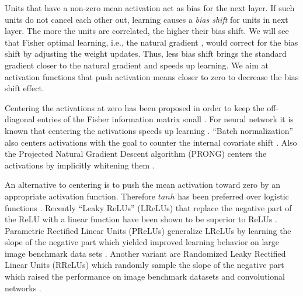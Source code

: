\documentclass{article}
\begin{document}
Units that have a non-zero mean activation act as bias for
the next layer.
If such units do not cancel each other out,
learning causes a {\em bias shift} for units in next layer.
The more the units are correlated, the higher their bias shift.
We will see that Fisher optimal learning, i.e., the natural
gradient \citep{Amari:98},
would correct for the bias shift
by adjusting the weight updates.
Thus, less bias shift brings the standard gradient closer to
the natural gradient and speeds up learning.
We aim at activation functions that push activation means closer to zero
to decrease the bias shift effect.

Centering the activations at zero
has been proposed in order to keep the off-diagonal entries of the
Fisher information matrix small \citep{Raiko:12}.
For neural network it is known that centering the activations
speeds up learning \citep{LeCun:91,LeCun:98,Schraudolph:98}.
%
``Batch normalization'' also centers activations with the goal
to counter the internal covariate shift \citep{Ioffe:15}.
Also the Projected Natural Gradient Descent algorithm (PRONG)
centers the activations by implicitly whitening them
\citep{Desjardins:15}.

An alternative to centering is to push the mean activation toward zero by
an appropriate activation function.
Therefore $tanh$ has been preferred over
logistic functions \citep{LeCun:91,LeCun:98}.
Recently ``Leaky ReLUs'' (LReLUs)
that replace the negative part of the ReLU with a linear function
have been shown to be superior to ReLUs \citep{Maas:13}.
Parametric Rectified Linear Units (PReLUs) generalize LReLUs
by learning the slope of the negative part which yielded
improved learning behavior on large image benchmark data sets \citep{He:15}.
Another variant are
Randomized Leaky Rectified Linear Units (RReLUs) which randomly sample
the slope of the negative part which raised the performance on
image benchmark datasets and convolutional networks \citep{Xu:15}.
\end{document}
